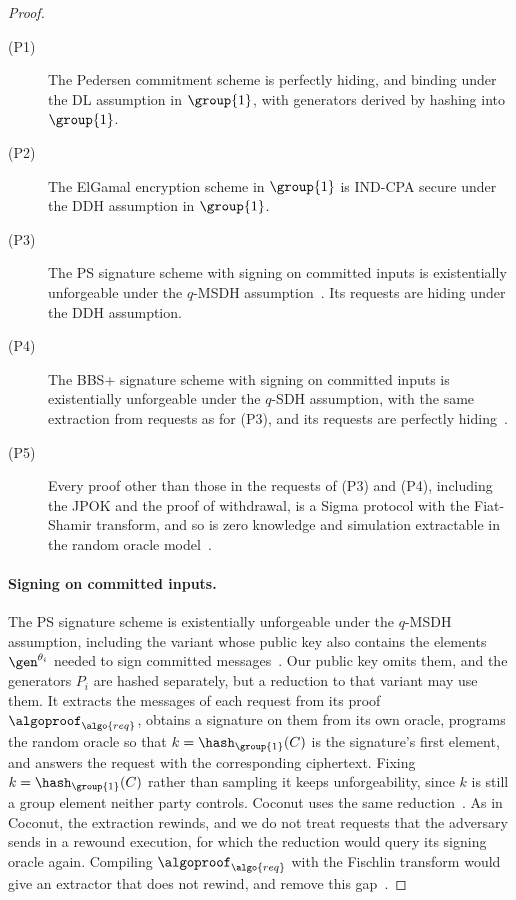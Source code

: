 \begin{proof}

\begin{description}

  \item[(P1)] The Pedersen commitment scheme is perfectly hiding, and binding
under the DL assumption in $\group{1}$, with generators derived by hashing into
$\group{1}$.

  \item[(P2)] The ElGamal encryption scheme in $\group{1}$ is IND-CPA secure
under the DDH assumption in $\group{1}$.

  \item[(P3)] The PS signature scheme with signing on committed inputs is
existentially unforgeable under the $q$-MSDH
assumption~\cite{RSA:PoiSan18,NDSS:SABMD19}. Its requests are hiding under the
DDH assumption.

  \item[(P4)] The BBS+ signature scheme with signing on committed inputs is
existentially unforgeable under the $q$-SDH assumption, with the same extraction
from requests as for (P3), and its requests are perfectly
hiding~\cite{SCN:AuSusMu06,CDL16}.

  \item[(P5)] Every proof other than those in the requests of (P3) and (P4),
including the JPOK and the proof of withdrawal, is a Sigma protocol with the
Fiat-Shamir transform, and so is zero knowledge and simulation extractable in
the random oracle model~\cite{C:FiaSha86,INDOCRYPT:FKMV12}.

\end{description}

\paragraph{Signing on committed inputs.} The PS signature scheme is
existentially unforgeable under the $q$-MSDH assumption, including the variant
whose public key also contains the elements $\gen^{\theta_i}$ needed to sign
committed messages~\cite{RSA:PoiSan18}. Our public key omits them, and the
generators $P_i$ are hashed separately, but a reduction to that variant may use
them. It extracts the messages of each
request from its proof $\algoproof_{\algo{req}}$, obtains a
signature on them from its own oracle, programs the random oracle so that $k =
\hash_{\group{1}}(C)$ is the signature's first element, and answers the request
with the corresponding ciphertext. Fixing $k = \hash_{\group{1}}(C)$ rather than
sampling it keeps unforgeability, since $k$ is still a group element neither
party controls. Coconut uses the same reduction~\cite{NDSS:SABMD19}. As in Coconut, the
extraction rewinds, and we do not treat requests that the adversary sends in a
rewound execution, for which the reduction would query its signing oracle again.
Compiling $\algoproof_{\algo{req}}$ with the Fischlin transform would give an
extractor that does not rewind, and remove this gap~\cite{C:Fischlin05}.


\end{proof}
